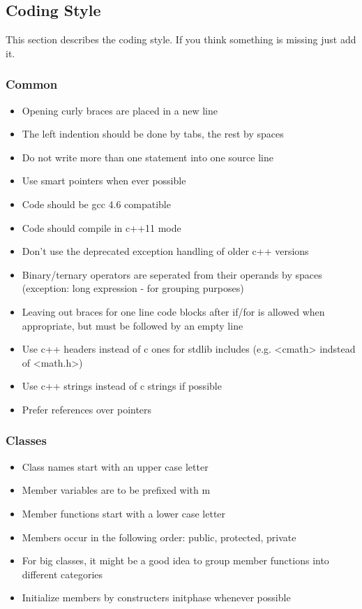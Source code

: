 \documentclass[a4paper]{scrartcl}
\begin{document}
\subsection{Coding Style}
This section describes the coding style. If you think something is missing just add it.


\subsubsection{Common}
\begin{itemize}
	\item Opening curly braces are placed in a new line
	\item The left indention should be done by tabs, the rest by spaces
	\item Do not write more than one statement into one source line
	\item Use smart pointers when ever possible
	\item Code should be gcc 4.6 compatible
	\item Code should compile in c++11 mode
	\item Don't use the deprecated exception handling of older c++ versions
	\item Binary/ternary operators are seperated from their operands by spaces (exception: long expression - for grouping purposes)
	\item Leaving out braces for one line code blocks after if/for is allowed when appropriate, but must be followed by an empty line 
	\item Use c++ headers instead of c ones for stdlib includes (e.g. <cmath> indstead of <math.h>)
	\item Use c++ strings instead of c strings if possible
	\item Prefer references over pointers
\end{itemize}



\subsubsection{Classes}
\begin{itemize}
	\item Class names start with an upper case letter
	\item Member variables are to be prefixed with m
	\item Member functions start with a lower case letter
	\item Members occur in the following order: public, protected, private
	\item For big classes, it might be a good idea to group member functions into different categories
	\item Initialize members by constructers initphase whenever possible
\end{itemize}
\end{document}
